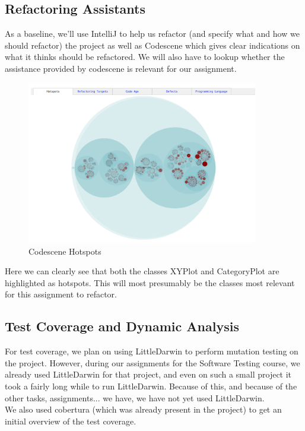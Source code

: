 \documentclass{article}
\begin{document}
\subsection{Refactoring Assistants}

As a baseline, we'll use IntelliJ to help us refactor (and specify what and how we should refactor) the project as well as Codescene which gives clear indications on what it thinks should be refactored. We will also have to lookup whether the assistance provided by codescene is relevant for our assignment.

\begin{figure}[H]
\centering
	\includegraphics[width=0.9\textwidth]{codescene_hotspots.png}
	\caption{Codescene Hotspots}
\end{figure}

Here we can clearly see that both the classes XYPlot and CategoryPlot are highlighted as hotspots. This will most presumably be the classes most relevant for this assignment to refactor.

\subsection{Test Coverage and Dynamic Analysis}

For test coverage, we plan on using LittleDarwin to perform mutation testing on the project. However, during our assignments for the Software Testing course, we already used LittleDarwin for that project, and even on such a small project it took a fairly long while to run LittleDarwin. Because of this, and because of the other tasks, assignments... we have, we have not yet used LittleDarwin.\\

We also used cobertura (which was already present in the project) to get an initial overview of the test coverage.
\end{document}
